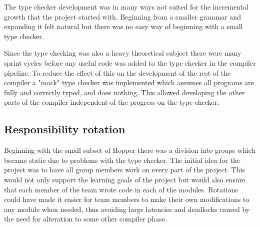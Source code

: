 The type checker development was in many ways not suited for the incremental growth that the project started with. Beginning from a smaller grammar and expanding it felt natural but there was no easy way of beginning with a small type checker. 

Since the type checking was also a heavy theoretical subject there were many sprint cycles before any useful code was added to the type checker in the compiler pipeline. To reduce the effect of this on the development of the rest of the compiler a "mock" type checker was implemented which assumes all programs are fully and correctly typed, and does nothing. This allowed developing the other parts of the compiler independent of the progress on the type checker.


\subsection{Responsibility rotation}

Beginning with the small subset of Hopper there was a division into groups which became static due to problems with the type checker.
The initial idea for the project was to have all group members work on every part of the project. This would not only support the learning goals of the project but would also ensure that each member of the team wrote code in each of the modules. Rotations could have made it easier for team members to make their own modifications to any module when needed, thus avoiding large latencies and deadlocks caused by the need for alteration to some other compiler phase. 

